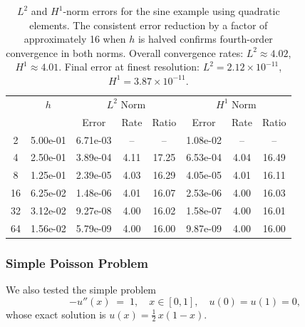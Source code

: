 \documentclass[a4paper,10pt]{article}
\begin{document}
\begin{table}[ht]
	\centering
	\begin{tabular}{|c|c|c|c|c|c|c|c|}
		\hline
		\rowcolor{blue!25!white} \multirow{1}{*}{$M$} & \multirow{1}{*}{$h$} & \multicolumn{3}{c|}{$L^2$ Norm} & \multicolumn{3}{c|}{$H^1$ Norm}                                   \\
		\cline{3-8}
		\rowcolor{blue!25!white}                      &                      & Error                           & Rate                            & Ratio & Error    & Rate & Ratio \\
		\hline
		2                                             & 5.00e-01             & 6.71e-03                        & --                              & --    & 1.08e-02 & --   & --    \\
		\rowcolor{blue!5!white}
		4                                             & 2.50e-01             & 3.89e-04                        & 4.11                            & 17.25 & 6.53e-04 & 4.04 & 16.49 \\
		8                                             & 1.25e-01             & 2.39e-05                        & 4.03                            & 16.29 & 4.05e-05 & 4.01 & 16.11 \\
		\rowcolor{blue!5!white}
		16                                            & 6.25e-02             & 1.48e-06                        & 4.01                            & 16.07 & 2.53e-06 & 4.00 & 16.03 \\
		32                                            & 3.12e-02             & 9.27e-08                        & 4.00                            & 16.02 & 1.58e-07 & 4.00 & 16.01 \\
		\rowcolor{blue!5!white}
		64                                            & 1.56e-02             & 5.79e-09                        & 4.00                            & 16.00 & 9.87e-09 & 4.00 & 16.00 \\
		\hline
	\end{tabular}
	\caption{$L^2$ and $H^1$-norm errors for the sine example using quadratic elements. The consistent error reduction by a factor of approximately 16 when $h$ is halved confirms fourth-order convergence in both norms. Overall convergence rates: $L^2 \approx 4.02$, $H^1 \approx 4.01$. Final error at finest resolution: $L^2 = 2.12 \times 10^{-11}$, $H^1 = 3.87 \times 10^{-11}$.}
	\label{tab:convergence_fancy}
\end{table}
\subsubsection*{Simple Poisson Problem}
We also tested the simple problem
\[
	-u''(x) \;=\; 1, \quad x \in [0,1], \quad u(0)=u(1)=0,
\]
whose exact solution is \(u(x) = \tfrac12\,x(1-x)\).
\end{document}
